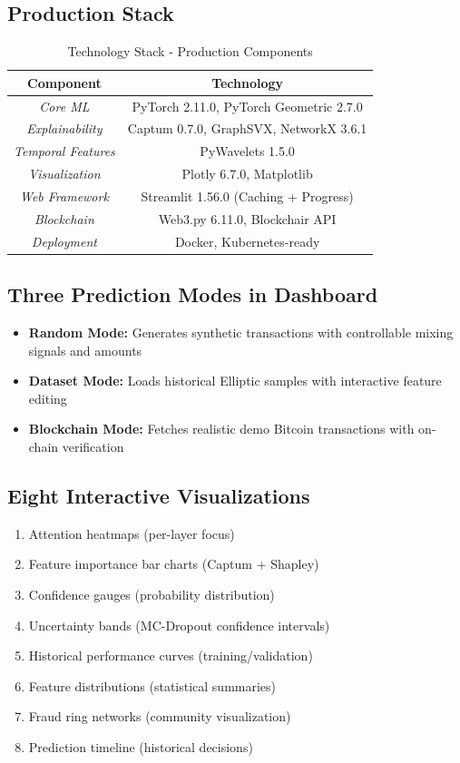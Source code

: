 \documentclass[10pt,conference,compsociety]{IEEEtran}
\begin{document}
\subsection{Production Stack}

\begin{table}[!h]
\centering
\caption{Technology Stack - Production Components}
\begin{tabular}{|c|c|}
\hline
\textbf{Component} & \textbf{Technology} \\
\hline
\textit{Core ML} & PyTorch 2.11.0, PyTorch Geometric 2.7.0 \\
\textit{Explainability} & Captum 0.7.0, GraphSVX, NetworkX 3.6.1 \\
\textit{Temporal Features} & PyWavelets 1.5.0 \\
\textit{Visualization} & Plotly 6.7.0, Matplotlib \\
\textit{Web Framework} & Streamlit 1.56.0 (Caching + Progress) \\
\textit{Blockchain} & Web3.py 6.11.0, Blockchair API \\
\textit{Deployment} & Docker, Kubernetes-ready \\
\hline
\end{tabular}
\end{table}

\subsection{Three Prediction Modes in Dashboard}

\begin{itemize}
    \item \textbf{Random Mode:} Generates synthetic transactions with controllable mixing signals and amounts
    \item \textbf{Dataset Mode:} Loads historical Elliptic samples with interactive feature editing
    \item \textbf{Blockchain Mode:} Fetches realistic demo Bitcoin transactions with on-chain verification
\end{itemize}

\subsection{Eight Interactive Visualizations}

\begin{enumerate}
    \item Attention heatmaps (per-layer focus)
    \item Feature importance bar charts (Captum + Shapley)
    \item Confidence gauges (probability distribution)
    \item Uncertainty bands (MC-Dropout confidence intervals)
    \item Historical performance curves (training/validation)
    \item Feature distributions (statistical summaries)
    \item Fraud ring networks (community visualization)
    \item Prediction timeline (historical decisions)
\end{enumerate}
\end{document}
